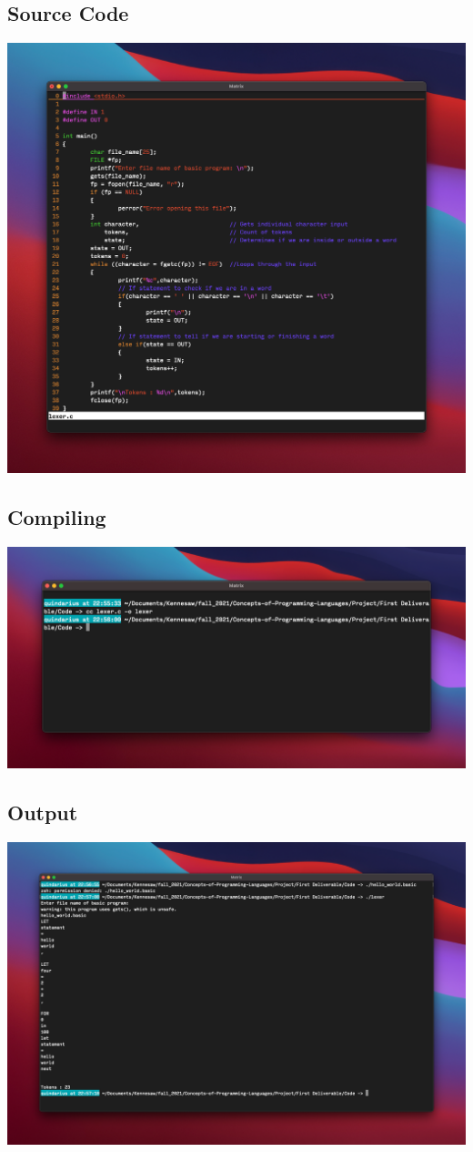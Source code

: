 \documentclass{report}
\begin{document}
\subsection*{Source Code}
\includegraphics[width =\textwidth]{source_code}
\subsection*{Compiling}
\includegraphics[width =\textwidth]{compile}
\subsection*{Output}
\includegraphics[width =\textwidth]{output}
\end{document}
